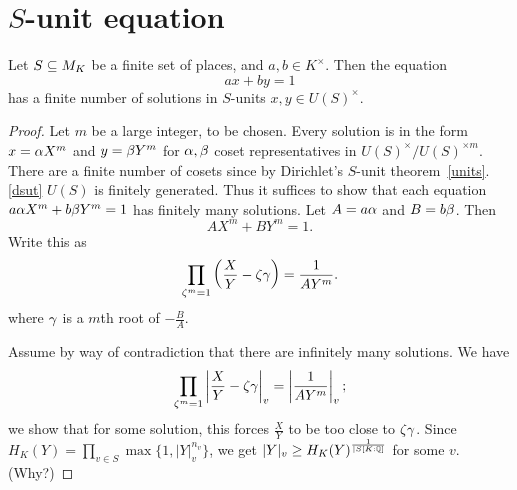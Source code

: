 \section{$S$-unit equation}
\begin{thm}
Let $S\subseteq M_K$ be a finite set of places, and $a,b\in K^{\times}$. Then the equation
\[
ax+by=1
\]
has a finite number of solutions in $S$-units $x,y\in U(S)^{\times}$.%
\end{thm}
\begin{proof}
Let $m$ be a large integer, to be chosen.
Every solution is in the form $x=\alpha X^m$ and $y=\beta Y^m$ for $\alpha,\beta$ coset representatives in $U(S)^{\times}/U(S)^{\times m}$. There are a finite number of cosets since by Dirichlet's $S$-unit theorem~\ref{units}.\ref{dsut} $U(S)$ is finitely generated. Thus it suffices to show that each equation $a\alpha X^m+b \beta Y^m=1$ has finitely many solutions. Let $A=a\alpha$ and $B=b\beta$. Then
\[
AX^m+BY^m=1.
\]
Write this as
\[
\prod_{\zeta^m=1}\left( {\frac XY -\zeta \gamma} \right)=\frac{1}{AY^m}.
\]
where $\gamma$ is a $m$th root of $-\frac BA$. 

Assume by way of contradiction that there are infinitely many solutions. We have
\[
\prod_{\zeta^m=1}\left| {\frac XY-\zeta \gamma} \right|_v=\left| {\frac{1}{AY^m}} \right|_v;
\]
we show that for some solution, this forces $\frac XY$ to be too close to $\zeta \gamma$. Since $H_K(Y)=\prod_{v\in S}\max\{1,|Y|_v^{n_v}\}$, we get $|Y|_v\ge H_K(Y)^{\frac{1}{|S[K:\mathbb{Q}]}}$ for some $v$. (Why?)

\end{proof}